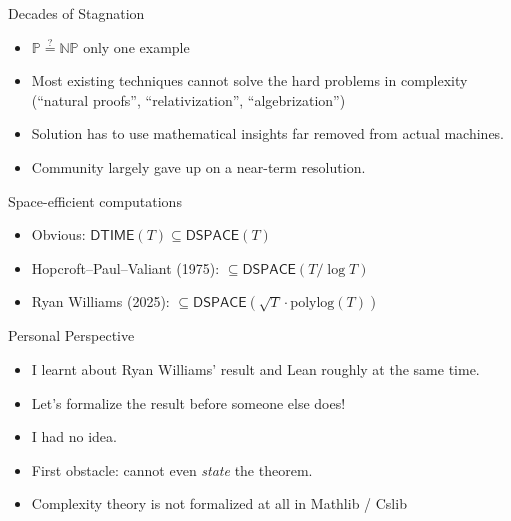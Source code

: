 \documentclass{beamer}
\begin{document}
\begin{frame}{Decades of Stagnation}
  \begin{itemize}
    \item $\mathbb{P} \stackrel{?}{=} \mathbb{NP}$ only one example
    \item Most existing techniques cannot solve the hard problems in complexity (``natural proofs'', ``relativization'', ``algebrization'')
    \item Solution has to use mathematical insights far removed from actual machines.
    \item Community largely gave up on a near-term resolution.
  \end{itemize}
\end{frame}

\begin{frame}{Space-efficient computations}
  \begin{itemize}
  \item<1-> Obvious: $\mathsf{DTIME}(T) \subseteq \mathsf{DSPACE}(T)$
  \item<2-> Hopcroft--Paul--Valiant (1975): $\subseteq \mathsf{DSPACE}(T / \log T)$
  \item<3-> Ryan Williams (2025): $\subseteq \mathsf{DSPACE}\!\left(\sqrt{T}\cdot\mathrm{polylog}(T)\right)$
  \end{itemize}

\end{frame}

\begin{frame}{Personal Perspective}
  \begin{itemize}
    \item<1-> I learnt about Ryan Williams' result and Lean roughly at the same time.
    \item<1-> Let's formalize the result before someone else does!
    \item<2-> I had no idea.
    \item<3-> First obstacle: cannot even \emph{state} the theorem.
    \item<3-> Complexity theory is not formalized at all in Mathlib / Cslib
  \end{itemize}

  \bigskip
\end{frame}
\end{document}
